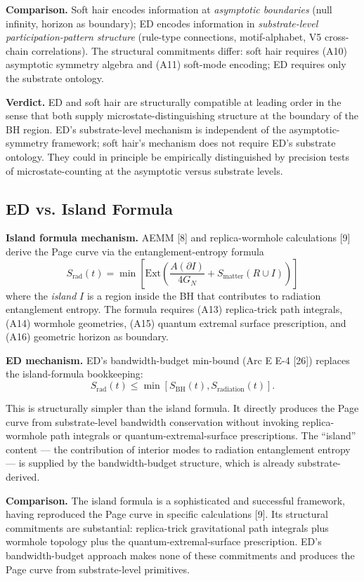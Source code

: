 \documentclass[11pt,a4paper]{article}
\begin{document}
\textbf{Comparison.} Soft hair encodes information at \emph{asymptotic boundaries} (null infinity, horizon as boundary); ED encodes information in \emph{substrate-level participation-pattern structure} (rule-type connections, motif-alphabet, V5 cross-chain correlations). The structural commitments differ: soft hair requires (A10) asymptotic symmetry algebra and (A11) soft-mode encoding; ED requires only the substrate ontology.

\textbf{Verdict.} ED and soft hair are structurally compatible at leading order in the sense that both supply microstate-distinguishing structure at the boundary of the BH region. ED's substrate-level mechanism is independent of the asymptotic-symmetry framework; soft hair's mechanism does not require ED's substrate ontology. They could in principle be empirically distinguished by precision tests of microstate-counting at the asymptotic versus substrate levels.

\subsection{ED vs. Island Formula}

\textbf{Island formula mechanism.} AEMM [8] and replica-wormhole calculations [9] derive the Page curve via the entanglement-entropy formula
\[
S_{\mathrm{rad}}(t) = \min\left[ \mathrm{Ext}\left( \frac{A(\partial I)}{4 G_N} + S_{\mathrm{matter}}(R \cup I) \right) \right]
\]
where the \emph{island} $I$ is a region inside the BH that contributes to radiation entanglement entropy. The formula requires (A13) replica-trick path integrals, (A14) wormhole geometries, (A15) quantum extremal surface prescription, and (A16) geometric horizon as boundary.

\textbf{ED mechanism.} ED's bandwidth-budget min-bound (Arc E E-4 [26]) replaces the island-formula bookkeeping:
\[
S_{\mathrm{rad}}(t) \leq \min\left[S_{\mathrm{BH}}(t), S_{\mathrm{radiation}}(t)\right].
\]

This is structurally simpler than the island formula. It directly produces the Page curve from substrate-level bandwidth conservation without invoking replica-wormhole path integrals or quantum-extremal-surface prescriptions. The ``island'' content --- the contribution of interior modes to radiation entanglement entropy --- is supplied by the bandwidth-budget structure, which is already substrate-derived.

\textbf{Comparison.} The island formula is a sophisticated and successful framework, having reproduced the Page curve in specific calculations [9]. Its structural commitments are substantial: replica-trick gravitational path integrals plus wormhole topology plus the quantum-extremal-surface prescription. ED's bandwidth-budget approach makes none of these commitments and produces the Page curve from substrate-level primitives.
\end{document}
